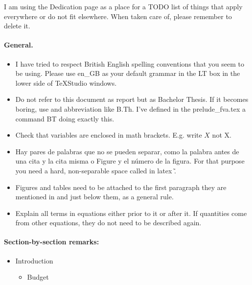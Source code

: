 {\color{red} %
I am using the Dedication page as a place for a TODO list of things that apply everywhere or do not fit elsewhere. When taken care of, please remember to delete it. 

\paragraph{General. }

\begin{itemize}

\item I have tried to  respect British English spelling conventions that you seem to be using. Please use en\_GB as your default grammar in the LT box in the lower side of TeXStudio windows. 

\item Do not refer to this document as report but as Bachelor Thesis. If it becomes boring, use and abbreviation like B.Th. I've defined in  the prelude\_fva.tex a command {}BT doing exactly this.

\item Check that variables are enclosed in math brackets. E.g. write $X$ not X.

\item Hay pares de palabras que no se pueden separar, como la palabra antes de una cita y la cita misma o Figure y el n\'umero de la figura. For that purpose you need a hard, non-separable space called in latex \~.

\item Figures and tables need to be attached to the first paragraph they are mentioned in and just below them, as a general rule. 

\item Explain all terms in equations either prior to it or after it. If quantities come from other equations, they do not need to be described again. 

\end{itemize}

\paragraph{Section-by-section remarks: }
\begin{itemize}
\item Introduction

\begin{itemize}
\item Budget

\end{itemize} 



\end{itemize}
} %
